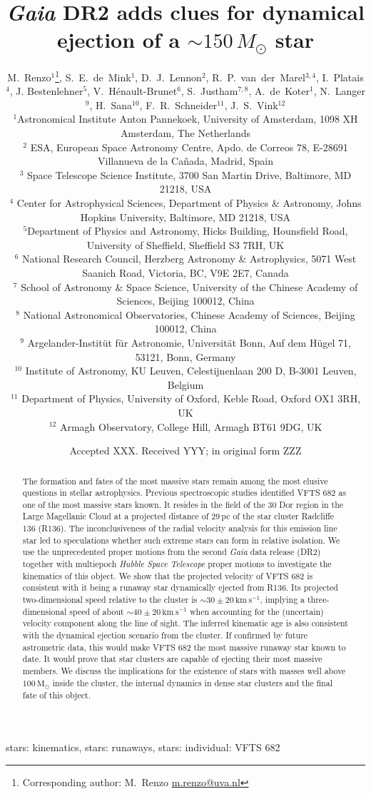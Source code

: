 \documentclass[a4paper,fleqn,usenatbib]{mnras}
\title[\emph{Gaia} DR2 adds clues for dynamical ejections of a $\sim$$150\,M_\odot$ star]{\emph{Gaia} DR2 adds clues for dynamical ejection of a $\sim$$150\,M_\odot$ star}
\author[Renzo et al.]{
M.~Renzo$^{1}$\thanks{Corresponding author: M.~Renzo
  \href{mailto:m.renzo@uva.nl}{m.renzo@uva.nl}},
S.~E.~de~Mink$^{1}$,
D.~J.~Lennon$^{2}$,
R.~P.~van~der~Marel$^{3,4}$,
I.~Platais$^{4}$,
J. Bestenlehner$^{5}$,
V.~H\'enault-Brunet$^{6}$,
S.~Justham$^{7,8}$,
A.~de~Koter$^{1}$,
N.~Langer$^{9}$,
H.~Sana$^{10}$,
F.~R.~Schneider$^{11}$,
J.~S.~Vink$^{12}$ \\
$^{1}${Astronomical Institute Anton Pannekoek, University of
  Amsterdam, 1098 XH Amsterdam, The Netherlands} \\
$^{2}$ {ESA, European Space Astronomy Centre, Apdo. de Correos 78,
  E-28691 Villanueva de la Ca\~nada, Madrid, Spain} \\
$^{3}$ {Space Telescope Science Institute, 3700 San Martin Drive,
  Baltimore, MD 21218, USA}\\
$^{4}$ {Center for Astrophysical Sciences, Department of Physics \& Astronomy, Johns Hopkins University, Baltimore, MD 21218, USA}\\
$^{5}${Department of Physics and Astronomy, Hicks Building,
  Hounsfield Road, University of Sheffield, Sheffield S3 7RH, UK}\\
$^{6}$ {National Research Council, Herzberg Astronomy \&
  Astrophysics, 5071 West Saanich Road, Victoria, BC, V9E 2E7,
  Canada}\\
$^{7}$ {School of Astronomy \& Space Science, University of the Chinese
  Academy of Sciences, Beijing 100012, China}\\
$^{8}$ {National Astronomical Observatories, Chinese Academy of
  Sciences, Beijing 100012, China}\\
$^{9}$ {Argelander-Instit\"ut f\"ur Astronomie, Universit\"at Bonn,
  Auf dem H\"ugel 71, 53121, Bonn, Germany}\\
$^{10}$ {Institute of Astronomy, KU Leuven, Celestijnenlaan 200 D, B-3001 Leuven, Belgium}\\
$^{11}$ {Department of Physics, University of Oxford, Keble Road,
  Oxford OX1 3RH, UK} \\
$^{12}$ {Armagh Observatory, College Hill, Armagh BT61 9DG, UK}
}
\date{Accepted XXX. Received YYY; in original form ZZZ}
\newcommand{\kms}{{\,\mathrm{km\ s^{-1}}}}
\newcommand{\Msun}{{\,\mathrm{M}_\odot}}
\begin{document}
\label{firstpage}
\pagerange{\pageref{firstpage}--\pageref{lastpage}}
\maketitle

\begin{abstract}

  The formation and fates of the most massive stars remain among the most elusive questions in stellar astrophysics. 
  Previous spectroscopic studies identified VFTS 682 as one of the most
  massive stars known. It resides in the field of the 30 Dor region in
  the Large Magellanic Cloud at a projected distance of 29\,pc of the
  star cluster Radcliffe 136 (R136). The inconclusiveness of the radial
  velocity analysis for this emission line star led to speculations whether such extreme
  stars can form in relative isolation. 
  We use the unprecedented proper motions from the second \emph{Gaia} data
  release (DR2) together with multiepoch \emph{Hubble Space Telescope} proper motions to investigate the kinematics of this object. We show
  that the projected velocity of VFTS 682 is consistent with it being a
  runaway star dynamically ejected from R136. Its
  projected two-dimensional speed relative to the cluster is $\sim$$30\pm20\kms$, implying a three-dimensional speed of about $\sim$$40\pm20\kms$ when
  accounting for the (uncertain) velocity component along the line of sight. The
  inferred kinematic age is also  consistent with the dynamical ejection scenario from the cluster. 
  If confirmed by future astrometric data, this would make VFTS 682
  the most massive runaway star known to date. It would prove that star clusters are capable of ejecting their most massive members. We discuss the implications for the existence of stars with masses well above $100\Msun$ inside the cluster, the internal dynamics in dense star clusters and the final fate of this object. 
\end{abstract}

\begin{keywords}
  stars: kinematics, stars: runaways, stars: individual: VFTS 682
\end{keywords}


\end{document}
